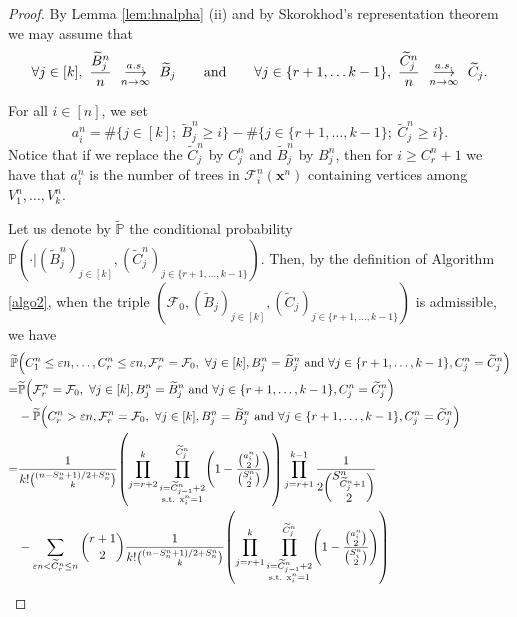 \documentclass[11pt]{article}
\theoremstyle{plain}
\theoremstyle{definition}
\theoremstyle{remark}
\renewcommand{\P}{{\mathbb{P}}} %
\newcommand{\1}{\mathbbm{1}} %
\newcommand{\proba}[1]{\mathbb{P}\left(#1\right)} %
\newcommand{\e}{\varepsilon} %
\newcommand{\F}{\mathcal{F}} %
\newcommand{\Xb}{\mathrm{\mathbf{x}}} %
\newcommand{\X}{\mathrm x} %
\newcommand{\cvps}[1][n]{\enskip\mathop{\longrightarrow}^{a.s.}_{#1 \to \infty}\enskip}
\let\originalleft\left
\let\originalright\right
\renewcommand{\left}{\mathopen{}\mathclose\bgroup\originalleft}
\renewcommand{\right}{\aftergroup\egroup\originalright}
\begin{document}
\begin{proof}
By Lemma \ref{lem:hnalpha} (ii) and by Skorokhod's representation theorem we may assume that
$$
\forall j \in [k], \ \frac{\widetilde{B}^n_j}{n} \cvps[n] \widetilde{B}_j \qquad \text{and}
\qquad
\forall j \in \{r+1, \ldots k-1\}, \ 
\frac{\widetilde{C}^n_j}{n}
\cvps
\widetilde{C}_j.
$$


For all $i\in[n]$, we set
\[a^n_i=\#\{j\in [k]; \ \widetilde{B}_j^n\ge i\}-\#\{j\in \{r+1,\ldots,k-1\}; \ \widetilde{C}_j^n\ge i\}.\]
Notice that if we replace the $\widetilde{C}^n_j$ by $C^n_j$ and $\widetilde{B}^n_j$ by $B^n_j$, then for $i\ge C_{r}^n+1$ we have that $a^n_i$ is the number of trees in $\F^n_i(\Xb^n)$ containing vertices among $V^n_1,\ldots,V^n_k$.

Let us denote by $\widetilde{\P}$ the conditional probability $\P(\cdot \vert (\widetilde{B}^n_j)_{j \in [k]}, (\widetilde{C}^n_j)_{j \in \{r+1,\ldots, k-1\}})$. Then, {by the definition of Algorithm \ref{algo2}}, when the triple $(\mathcal{F}_0, (\widetilde{B}_j)_{j\in [k]}, (\widetilde{C}_j)_{j \in \{r+1,\ldots, k-1 \}})$ is admissible, we have
\begin{align*}
\widetilde{\P}&\left(C_1^n\le \e n, \ldots, C_r^n \le \e n, \mathcal{F}^n_r=\mathcal{F}_0, \  \forall j \in [k],  B^n_j=\widetilde{B}_j^n \text{ and } \forall j \in \{r+1,\ldots, k-1\},  C^n_j=\widetilde{C}_j^n \right) \\
=&\widetilde{\P}\left( \mathcal{F}^n_r=\mathcal{F}_0, \  \forall j \in [k],  B^n_j=\widetilde{B}_j^n \text{ and } \forall j \in \{r+1,\ldots, k-1\},  C^n_j=\widetilde{C}_j^n \right)\\
&-\widetilde{\P}\left(C_r^n > \e n, \mathcal{F}^n_r=\mathcal{F}_0, \  \forall j \in [k],  B^n_j=\widetilde{B}_j^n \text{ and } \forall j \in \{r+1,\ldots, k-1\},  C^n_j=\widetilde{C}_j^n \right) \\
= &\frac{ 1}{k!{\binom{{(n-S^n_n+1)  / 2 +S_n^n}}{k}}} \left( \prod_{j=r+2}^{k} 
\prod_{\substack{i=\widetilde{C}^n_{j-1}+2\\ \text{s.t. }\X^n_i=1}}^{\widetilde{C}^n_j} \left( 1- \frac{\binom{a^n_i}{2}}{\binom{S_i^n}{2}}\right)\right) 
\prod_{j=r+1}^{k-1} \frac{1}{\displaystyle2\binom{S^n_{\widetilde{C}^n_j+1}}{2}}\\
&-\sum_{\e n <\widetilde{C}^n_r\le n} \binom{r+1}{2}\frac{ 1}{k!{\binom{{(n-S^n_n+1)  / 2 +S_n^n}}{k}}} \left( \prod_{j=r+1}^{k} 
\prod_{\substack{i=\widetilde{C}^n_{j-1}+2\\ \text{s.t. }\X^n_i=1}}^{\widetilde{C}^n_j} \left( 1- \frac{\binom{a^n_i}{2}}{\binom{S_i^n}{2}}\right)\right) 

\end{align*}
\end{proof}
\end{document}
